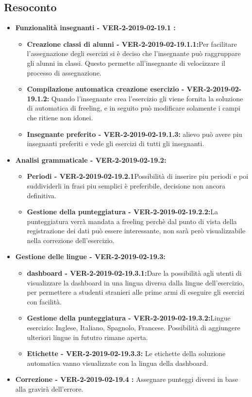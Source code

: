 \documentclass[a4paper, oneside, openany, dvipsnames, table]{article}
\begin{document}
\subsection{Resoconto}
\begin{itemize}
	\item \textbf{Funzionalità insegnanti - VER-2-2019-02-19.1 :} 
	\begin{itemize}
		\item \textbf{Creazione classi di alunni - VER-2-2019-02-19.1.1:}Per facilitare l'assegnazione degli esercizi si è deciso che l'insegnante
		può raggruppare gli alunni in classi. Questo permette all'insegnante di velocizzare
		il processo di assegnazione.
		\item \textbf{Compilazione automatica creazione esercizio - VER-2-2019-02-19.1.2:}
		Quando l'insegnante crea l'esercizio gli viene fornita la soluzione di automatica di freeling,
		e in seguito può modificare solamente i campi che ritiene non idonei.
		\item \textbf{Insegnante preferito - VER-2-2019-02-19.1.3:} alievo può avere piu insegnanti preferiti e vede gli esercizi di tutti gli insegnanti.
	\end{itemize}
	\item \textbf{Analisi grammaticale - VER-2-2019-02-19.2:}
	\begin{itemize}
		\item \textbf{Periodi - VER-2-2019-02-19.2.1}Possibilità di inserire piu periodi e poi suddividerli in frasi piu semplici è preferibile, decisione non ancora definitiva.
		\item \textbf{Gestione della punteggiatura - VER-2-2019-02-19.2.2:}La punteggiatura verrà mandata a freeling perchè 
		dal punto di vista della registrazione dei dati può essere interessante, non sarà però visualizzabile nella correzione dell'esercizio.  
	\end{itemize}
	\item \textbf{Gestione delle lingue - VER-2-2019-02-19.3:} 
	\begin{itemize}
		\item \textbf{dashboard - VER-2-2019-02-19.3.1:}Dare la possibilità agli utenti di visualizzare la dashboard in una lingua diversa dalla lingue dell'esercizio,
		per permettere a studenti stranieri alle prime armi di eseguire gli esercizi con facilità.
		\item \textbf{Gestione della punteggiatura - VER-2-2019-02-19.3.2:}Lingue esercizio: 
		Inglese, Italiano, Spagnolo, Francese. Possibilità di aggiungere ulteriori lingue in fututro rimane aperta.
		\item \textbf{Etichette - VER-2-2019-02-19.3.3:} Le etichette della soluzione automatica
		vanno visualizzate con la lingua della dashboard.
	\end{itemize}
	\item \textbf{Correzione - VER-2-2019-02-19.4 :} 
	Assegnare punteggi diversi in base alla gravirà dell'errore.
	

\end{itemize}
\end{document}
